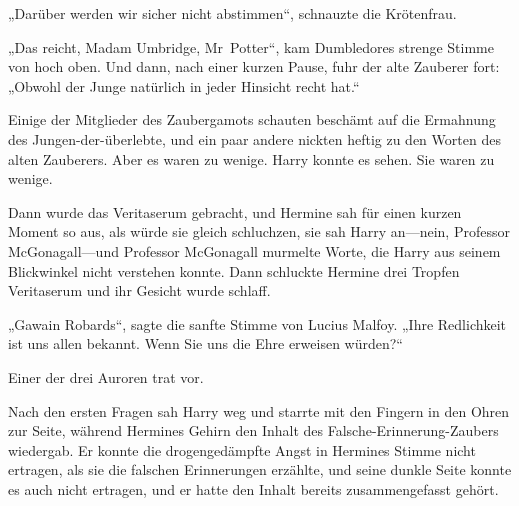 „Darüber werden wir sicher nicht abstimmen“, schnauzte die Krötenfrau.

„Das reicht, Madam Umbridge, Mr~Potter“, kam Dumbledores strenge Stimme von hoch oben.
Und dann, nach einer kurzen Pause, fuhr der alte Zauberer fort:
„Obwohl der Junge natürlich in jeder Hinsicht recht hat.“

Einige der Mitglieder des Zaubergamots schauten beschämt auf die Ermahnung des Jungen-der-überlebte, und ein paar andere nickten heftig zu den Worten des alten Zauberers. Aber es waren zu wenige. Harry konnte es sehen. Sie waren zu wenige.

Dann wurde das Veritaserum gebracht, und Hermine sah für einen kurzen Moment so aus, als würde sie gleich schluchzen, sie sah Harry an—nein, Professor McGonagall—und Professor McGonagall murmelte Worte, die Harry aus seinem Blickwinkel nicht verstehen konnte. Dann schluckte Hermine drei Tropfen Veritaserum und ihr Gesicht wurde schlaff.

„Gawain Robards“, sagte die sanfte Stimme von Lucius Malfoy. „Ihre Redlichkeit ist uns allen bekannt. Wenn Sie uns die Ehre erweisen würden?“

Einer der drei Auroren trat vor.

Nach den ersten Fragen sah Harry weg und starrte mit den Fingern in den Ohren zur Seite, während Hermines Gehirn den Inhalt des Falsche-Erinnerung-Zaubers wiedergab. Er konnte die drogengedämpfte Angst in Hermines Stimme nicht ertragen, als sie die falschen Erinnerungen erzählte, und seine dunkle Seite konnte es auch nicht ertragen, und er hatte den Inhalt bereits zusammengefasst gehört.


